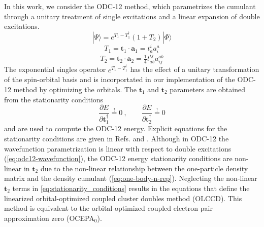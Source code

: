 In this work, we consider the ODC-12
method,\cite{Sokolov:2013p024107,Sokolov:2013p204110} which parametrizes the
cumulant through a unitary treatment of single excitations and a linear
expansion of double excitations.
\begin{equation}
    \label{eq:odc12-wavefunction}
    |\Psi\rangle
    =
    e^{T_1-T_1^\dagger}
    (1 + T_2)
    |\Phi\rangle
\end{equation}
\begin{equation}
    T_1
    =
    \mathbf{t}_1\cdot\mathbf{a}_1
    =
    t_a^i
    a^a_i
\end{equation}
\begin{equation}
    T_2
    =
    \mathbf{t}_2\cdot\mathbf{a}_2
    =
    \tfrac{1}{4}
    t_{ab}^{ij}
    a^{ab}_{ij}
\end{equation}
The exponential singles operator \(e^{T_1-T_1^\dagger}\) has the effect of a
unitary transformation of the spin-orbital basis and is incorportated in our
implementation of the ODC-12 method by optimizing the
orbitals.\cite{Sokolov:2013p204110}
The \(\mathbf{t}_1\) and \(\mathbf{t}_2\) parameters are obtained from the
stationarity conditions
\begin{equation}
    \label{eq:stationarity_conditions}
    \dfrac{\partial E}{\partial \mathbf{t}_1^\dagger}
    \overset{!}{=}
    0 \ ,
    \qquad
    \dfrac{\partial E}{\partial \mathbf{t}_2^\dagger}
    \overset{!}{=}
    0
\end{equation}
and are used to compute the ODC-12 energy.
Explicit equations for the stationarity conditions are given in Refs.\@
{} and .
Although in ODC-12 the wavefunction parametrization is linear with respect
to double excitations (\cref{eq:odc12-wavefunction}), the ODC-12 energy
stationarity conditions are non-linear in $\mathbf{t}_2$ due to the non-linear
relationship between the one-particle density matrix and the density cumulant
(\cref{eq:one-body-n-rep}).\cite{Sokolov:2013p024107} Neglecting the non-linear
$\mathbf{t}_2$ terms in \cref{eq:stationarity_conditions} results in the
equations that define the linearized orbital-optimized  coupled cluster doubles
method (OLCCD).
This method is equivalent to the orbital-optimized coupled electron pair
approximation zero (OCEPA$_0$).\cite{Bozkaya:2013p054104}

